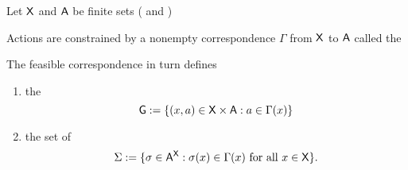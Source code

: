 \begin{frame}
    
    Let $\mathsf X$ and $\mathsf A$ be finite sets ( and )

        \vspace{0.5em}
    Actions are constrained by 
        a nonempty correspondence $\Gamma$ from $\mathsf X$ to $\mathsf A$ called
            the 


    The feasible correspondence in turn defines
    \begin{enumerate}
        \item the 
            \begin{equation*}
                \mathsf G := \{ (x, a) \in \mathsf X \times \mathsf A : a \in \Gamma(x) \}
            \end{equation*}
        \item the set of  
            \begin{equation*}
                \Sigma := 
                    \{ \sigma \in \mathsf A^\mathsf X : \sigma(x) \in \Gamma(x) \text{ for all } x \in \mathsf X \}.
            \end{equation*}
    \end{enumerate}

\end{frame}

